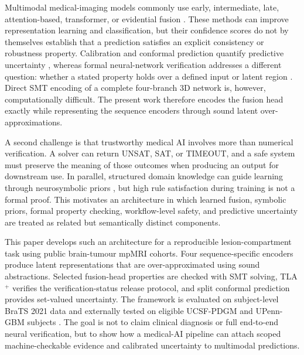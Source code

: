 \documentclass[preprint,11pt]{elsarticle}
\begin{document}
Multimodal medical-imaging models commonly use early, intermediate, late, attention-based, transformer, or evidential fusion \cite{ramachandram2017deep,chen2021transunet,hatamizadeh2022unetr,hayat2022medfuse,sensoy2018evidential}. These methods can improve representation learning and classification, but their confidence scores do not by themselves establish that a prediction satisfies an explicit consistency or robustness property. Calibration and conformal prediction quantify predictive uncertainty \cite{vovk2005algorithmic,angelopoulos2021gentle,romano2020classification}, whereas formal neural-network verification addresses a different question: whether a stated property holds over a defined input or latent region \cite{katz2017reluplex,katz2019marabou,singh2019abstract,zhang2018efficient}. Direct SMT encoding of a complete four-branch 3D network is, however, computationally difficult. The present work therefore encodes the fusion head exactly while representing the sequence encoders through sound latent over-approximations.

A second challenge is that trustworthy medical AI involves more than numerical verification. A solver can return UNSAT, SAT, or TIMEOUT, and a safe system must preserve the meaning of those outcomes when producing an output for downstream use. In parallel, structured domain knowledge can guide learning through neurosymbolic priors \cite{donadello2017ltn,badreddine2022logic,manhaeve2018deepproblog}, but high rule satisfaction during training is not a formal proof. This motivates an architecture in which learned fusion, symbolic priors, formal property checking, workflow-level safety, and predictive uncertainty are treated as related but semantically distinct components.

This paper develops such an architecture for a reproducible lesion-compartment task using public brain-tumour mpMRI cohorts. Four sequence-specific encoders produce latent representations that are over-approximated using sound abstractions. Selected fusion-head properties are checked with SMT solving, TLA$^{+}$ verifies the verification-status release protocol, and split conformal prediction provides set-valued uncertainty. The framework is evaluated on subject-level BraTS 2021 data and externally tested on eligible UCSF-PDGM and UPenn-GBM subjects \cite{brats2021,ucsf2022,upenn2022}. The goal is not to claim clinical diagnosis or full end-to-end neural verification, but to show how a medical-AI pipeline can attach scoped machine-checkable evidence and calibrated uncertainty to multimodal predictions.
\end{document}
